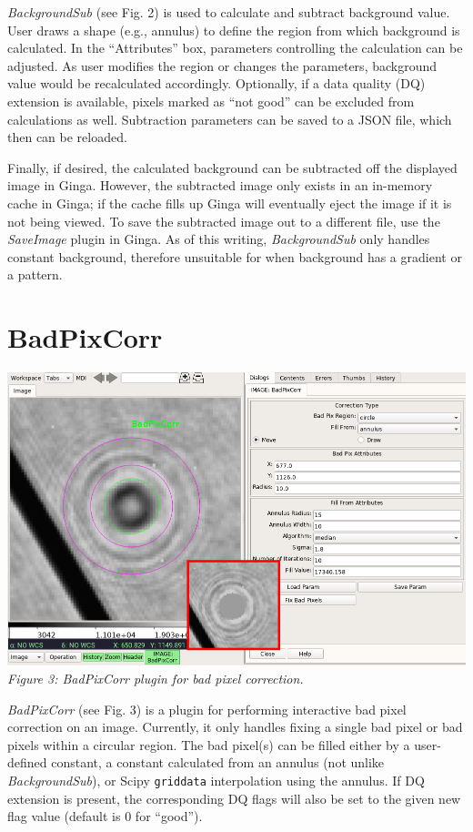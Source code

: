 \documentclass[]{article}
\begin{document}
\begin{multicols}{3}
\para
{\em BackgroundSub} (see Fig. 2) is used to calculate and subtract background
value. User draws a shape (e.g., annulus) to define
the region from which background is calculated. In the ``Attributes'' box,
parameters controlling the calculation can be adjusted.
As user modifies the region or changes the parameters, background value would
be recalculated accordingly.
Optionally, if a data quality (DQ) extension is available, pixels marked as
``not good'' can be excluded from calculations as well.
Subtraction parameters can be saved to a JSON file, which then can be reloaded.

\para
Finally, if desired, the calculated background can be subtracted off
the displayed image in Ginga.
However, the subtracted image only exists in an in-memory cache in Ginga;
if the cache fills up Ginga will eventually eject the image if it is not
being viewed. 
To save the subtracted image out to a different file, use the {\em SaveImage}
plugin in Ginga.
As of this writing, {\em BackgroundSub} only handles constant
background, therefore unsuitable for when background has a gradient or a
pattern. 

\section*{BadPixCorr}

\begin{center}
\includegraphics[width=8in]{plugin_badpixcorr.png}
\label{fig:plugin_badpixcorr}
\vspace*{0.4em}
{\small\em Figure 3: BadPixCorr plugin for bad pixel correction.}
\end{center}

\para
{\em BadPixCorr} (see Fig. 3) is a plugin for performing interactive bad pixel
correction on an image. Currently, it only handles fixing a single bad pixel or
bad pixels within a circular region.
The bad pixel(s) can be filled either by a user-defined constant, a constant
calculated from an annulus (not unlike {\em BackgroundSub}), or Scipy
{\tt griddata} interpolation using the annulus.
If DQ extension is present, the corresponding DQ flags will also be set
to the given new flag value (default is 0 for ``good'').


\end{multicols}
\end{document}
